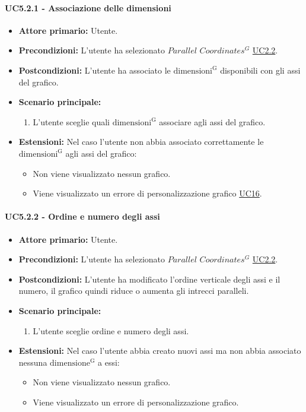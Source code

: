 \paragraph{UC5.2.1 - Associazione delle dimensioni}
\label{sec:UC5.2.1}
    \begin{itemize}
        \item \textbf{Attore primario:} Utente.
        \item \textbf{Precondizioni:} L'utente ha selezionato $Parallel$ $Coordinates^{G}$ \hyperref[sec:UC2.2]{UC2.2}.
	    \item \textbf{Postcondizioni:} L'utente ha associato le ${\mathrm{dimensioni^{G}}}$ disponibili con gli assi del grafico.
	    \item \textbf{Scenario principale:}
	    \begin{enumerate}
	    		\item L'utente sceglie quali ${\mathrm{dimensioni^{G}}}$ associare agli assi del grafico.
		\end{enumerate}
	    \item \textbf{Estensioni:} Nel caso l'utente non abbia associato correttamente le ${\mathrm{dimensioni^{G}}}$ agli assi del grafico:
              \begin{itemize}
                  \item Non viene visualizzato nessun grafico.
                  \item Viene visualizzato un errore di personalizzazione grafico \hyperref[sec:UC16 - Errore di personalizzazione]{UC16}.
              \end{itemize}
    \end{itemize}
\paragraph{UC5.2.2 - Ordine e numero degli assi}
\label{sec:UC5.2.2}
    \begin{itemize}
        \item \textbf{Attore primario:} Utente.
        \item \textbf{Precondizioni:} L'utente ha selezionato $Parallel$ $Coordinates^{G}$ \hyperref[sec:UC2.2]{UC2.2}.
	    \item \textbf{Postcondizioni:} L'utente ha modificato l'ordine verticale degli assi e il numero, il grafico quindi riduce o aumenta gli intrecci paralleli.
	    \item \textbf{Scenario principale:} 
	    \begin{enumerate}
	    		\item L'utente sceglie ordine e numero degli assi.
		\end{enumerate}
	    \item \textbf{Estensioni:} Nel caso l'utente abbia creato nuovi assi ma non abbia associato nessuna ${\mathrm{dimensione^{G}}}$ a essi:
              \begin{itemize}
                  \item Non viene visualizzato nessun grafico.
                  \item Viene visualizzato un errore di personalizzazione grafico.
              \end{itemize}
    \end{itemize}
    
